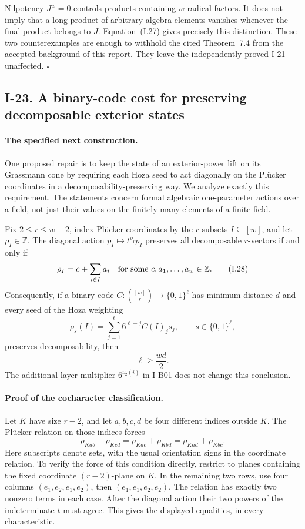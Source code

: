 Nilpotency $J^w=0$ controls products containing $w$ radical
factors.  It does not imply that a long product of arbitrary
algebra elements vanishes whenever the final product belongs
to $J$.  Equation~(I.27) gives precisely this distinction.
These two counterexamples are enough to withhold the cited
Theorem~7.4 from the accepted background of this report.
They leave the independently proved I-21 unaffected.
\hfill$\square$


\subsection{I-23. A binary-code cost for preserving decomposable exterior states}
\label{I-23}

\paragraph{The specified next construction.}
One proposed repair is to keep the state of an exterior-power lift
on its Grassmann cone by requiring each Hoza seed to act diagonally
on the Pl\"ucker coordinates in a decomposability-preserving way.
We analyze exactly this requirement.  The statements concern
formal algebraic one-parameter actions over a field, not just
their values on the finitely many elements of a finite field.

Fix $2\le r\le w-2$, index Pl\"ucker coordinates by the
$r$-subsets $I\subseteq[w]$, and let $\rho_I\in\mathbb Z$.
The diagonal action $p_I\mapsto t^{\rho_I}p_I$ preserves all
decomposable $r$-vectors if and only if
\[
 \rho_I=c+\sum_{i\in I}a_i
 \quad\hbox{for some }c,a_1,\ldots,a_w\in\mathbb Z.
 \tag{I.28}\label{eq:I-plucker-additive}
\]
Consequently, if a binary code
$C:\binom{[w]}r\to\{0,1\}^{\ell}$ has minimum distance $d$
and every seed of the Hoza weighting
\[
 \rho_s(I)=\sum_{j=1}^{\ell}6^{\ell-j}C(I)_js_j,
 \qquad s\in\{0,1\}^{\ell},
\]
preserves decomposability, then
\[
 \ell\ge\frac{wd}{2}.
 \tag{I.29}\label{eq:I-plucker-code-cost}
\]
The additional layer multiplier $6^{\nu_2(i)}$ in I-B01
does not change this conclusion.

\paragraph{Proof of the cocharacter classification.}
Let $K$ have size $r-2$, and let $a,b,c,d$ be four different
indices outside $K$.  The Pl\"ucker relation on those indices
forces
\[
 \rho_{Kab}+\rho_{Kcd}
 =\rho_{Kac}+\rho_{Kbd}
 =\rho_{Kad}+\rho_{Kbc}.
\]
Here subscripts denote sets, with the usual orientation signs
in the coordinate relation.  To verify the force of this
condition directly, restrict to planes containing the fixed
coordinate $(r-2)$-plane on $K$.  In the remaining two rows,
use four columns $(e_1,e_2,e_1,e_2)$, then
$(e_1,e_1,e_2,e_2)$.  The relation has exactly two nonzero
terms in each case.  After the diagonal action their two powers
of the indeterminate $t$ must agree.  This gives the displayed
equalities, in every characteristic.

